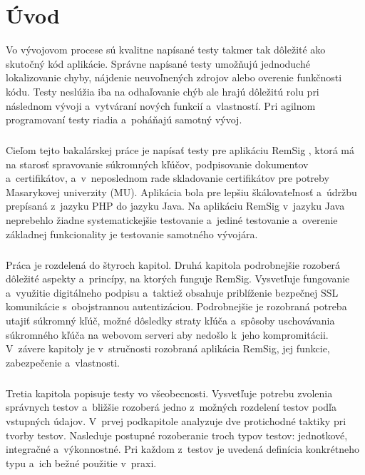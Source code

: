 \documentclass[
  digital, %
  table,   %
oneside,
  nolof,     %
  nolot,     %
]{fithesis3}
\begin{document}
\chapter{Úvod}
Vo vývojovom procese sú kvalitne napísané testy takmer tak dôležité ako skutočný kód aplikácie. Správne napísané testy umožňujú jednoduché lokalizovanie chyby, nájdenie neuvoľnených zdrojov alebo overenie funkčnosti kódu. Testy neslúžia iba na odhaľovanie chýb ale hrajú dôležitú rolu pri následnom vývoji a~vytváraní nových funkcií a~vlastností. Pri agilnom programovaní \cite{agileDef} testy riadia a~poháňajú samotný vývoj. \paragraph{}
Cieľom tejto bakalárskej práce je napísať testy pre aplikáciu RemSig \cite{remsigMuni}, ktorá má na starosť spravovanie súkromných kľúčov, podpisovanie dokumentov a~certifikátov, a~v~neposlednom rade skladovanie certifikátov pre potreby Masarykovej univerzity (MU). Aplikácia bola pre lepšiu škálovateľnosť a~údržbu prepísaná z~jazyku PHP do jazyku Java. Na aplikáciu RemSig  v~jazyku Java neprebehlo žiadne systematickejšie testovanie a~jediné testovanie a~overenie základnej funkcionality je testovanie samotného vývojára.\paragraph{}
Práca je rozdelená do štyroch kapitol. Druhá kapitola podrobnejšie rozoberá dôležité aspekty a~princípy, na ktorých funguje RemSig. Vysvetľuje fungovanie a~využitie digitálneho podpisu a~taktiež obsahuje priblíženie bezpečnej SSL komunikácie s~obojstrannou autentizáciou. Podrobnejšie je rozobraná potreba utajiť súkromný kľúč, možné dôsledky straty kľúča a~spôsoby uschovávania súkromného kľúča na webovom serveri aby nedošlo k~jeho kompromitácii. V~závere kapitoly  je v~stručnosti rozobraná aplikácia RemSig, jej funkcie, zabezpečenie a~vlastnosti. \paragraph{}
Tretia kapitola popisuje testy vo všeobecnosti. Vysvetľuje potrebu zvolenia správnych testov a~bližšie rozoberá jedno z~možných rozdelení testov podľa vstupných údajov. V~prvej podkapitole analyzuje dve protichodné taktiky pri tvorby testov. Nasleduje postupné rozoberanie troch typov testov: jednotkové, integračné a~výkonnostné. Pri každom z~testov je uvedená definícia konkrétneho typu a~ich bežné použitie v~praxi.\paragraph{}
\end{document}
